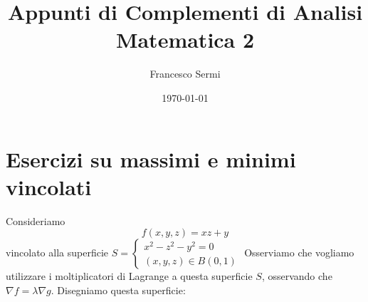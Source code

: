 \documentclass[openany, italian]{book}
\title{Appunti di Complementi di Analisi Matematica 2}
\author{Francesco Sermi}
\date{\today}
\begin{document}
\maketitle
\section{Esercizi su massimi e minimi vincolati}
Consideriamo
$$
f(x, y, z) = xz + y
$$
vincolato alla superficie $S=\begin{cases}
x^2 - z^2 - y^2 = 0 \\
(x, y, z) \in B(0, 1)
\end{cases}$
Osserviamo che vogliamo utilizzare i moltiplicatori di Lagrange a questa superficie $S$, osservando che $\nabla f = \lambda \nabla g$. Disegniamo questa superficie:
\end{document}
